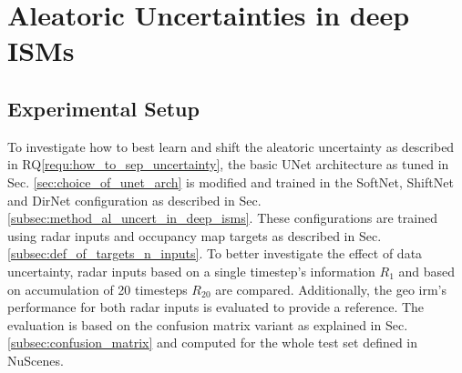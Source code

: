 \section{Aleatoric Uncertainties in deep ISMs}
\label{sec:al_uncert_in_deep_isms}
%
\subsection{Experimental Setup}
\label{subsec:exp_setup_aleat_uncert}
To investigate how to best learn and shift the aleatoric uncertainty as described in RQ\ref{requ:how_to_sep_uncertainty}, the basic UNet architecture as tuned in Sec. \ref{sec:choice_of_unet_arch} is modified and trained in the SoftNet, ShiftNet and DirNet configuration as described in Sec. \ref{subsec:method_al_uncert_in_deep_isms}. These configurations are trained using radar inputs and occupancy map targets as described in Sec. \ref{subsec:def_of_targets_n_inputs}. To better investigate the effect of data uncertainty, radar inputs based on a single timestep's information $R_1$ and based on accumulation of 20 timesteps $R_{20}$ are compared. Additionally, the geo \gls{irm}'s performance for both radar inputs is evaluated to provide a reference. The evaluation is based on the confusion matrix variant as explained in Sec. \ref{subsec:confusion_matrix} and computed for the whole test set defined in NuScenes.
%
